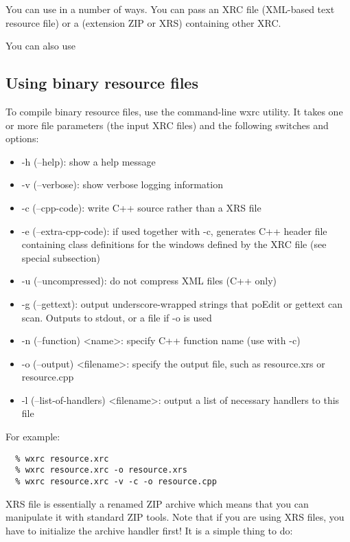 You can use  in a number of ways.
You can pass an XRC file (XML-based text resource file)
or a  (extension ZIP or XRS) containing other XRC.

You can also use 

\subsection{Using binary resource files}\label{binaryresourcefiles}

To compile binary resource files, use the command-line wxrc utility. It takes one or more file parameters
(the input XRC files) and the following switches and options:
\begin{itemize}\itemsep=0pt
\item -h (--help): show a help message
\item -v (--verbose): show verbose logging information
\item -c (--cpp-code): write C++ source rather than a XRS file
\item -e (--extra-cpp-code): if used together with -c, generates C++ header file
containing class definitions for the windows defined by the XRC file (see special subsection) 
\item -u (--uncompressed): do not compress XML files (C++ only)
\item -g (--gettext): output underscore-wrapped strings that poEdit or gettext can scan. Outputs to stdout, or a file if -o is used
\item -n (--function) <name>: specify C++ function name (use with -c)
\item -o (--output) <filename>: specify the output file, such as resource.xrs or resource.cpp
\item -l (--list-of-handlers) <filename>: output a list of necessary handlers to this file
\end{itemize}

For example:
\begin{verbatim}
  % wxrc resource.xrc
  % wxrc resource.xrc -o resource.xrs
  % wxrc resource.xrc -v -c -o resource.cpp
\end{verbatim}


XRS file is essentially a renamed ZIP archive which means that you can manipulate
it with standard ZIP tools. Note that if you are using XRS files, you have
to initialize the  archive handler first! It is a simple
thing to do:

